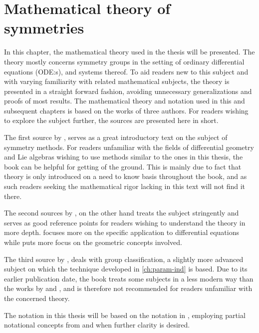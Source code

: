 \chapter{Mathematical theory of symmetries}

In this chapter, the mathematical theory used in the thesis will be presented.
The theory mostly concerns symmetry groups in the setting of ordinary differential equations (ODE:s), and systems thereof.
To aid readers new to this subject and with varying familiarity with related mathematical subjects, the theory is presented in a straight forward fashion, avoiding unnecessary generalizations and proofs of most results.
The mathematical theory and notation used in this and subsequent chapters is based on the works of three authors.
For readers wishing to explore the subject further, the sources are presented here in short.

The first source \cite{hydon2000symmetry} by \citeauthor{hydon2000symmetry}, serves as a great introductory text on the subject of symmetry methods.
For readers unfamiliar with the fields of differential geometry and Lie algebras wishing to use methods similar to the ones in this thesis, the book can be helpful for getting of the ground.
This is mainly due to fact that theory is only introduced on a need to know basis throughout the book, and as such readers seeking the mathematical rigor lacking in this text will not find it there.

The second sources \cite{olver1993applications,olver1995equivalence} by \citeauthor{olver1993applications}, on the other hand treats the subject stringently and serves as good reference points for readers wishing to understand the theory in more depth.
\cite{olver1993applications} focuses more on the specific application to differential equations while \cite{olver1995equivalence} puts more focus on the geometric concepts involved.

The third source \cite{ovsiannikov1982group} by \citeauthor{ovsiannikov1982group}, deals with group classification, a slightly more advanced subject on which the technique developed in \cref{ch:param-ind} is based.
Due to its earlier publication date, the book treats some subjects in a less modern way than the works by \citeauthor{hydon2000symmetry} and \citeauthor{olver1993applications}, and is therefore not recommended for readers unfamiliar with the concerned theory.

The notation in this thesis will be based on the notation in \cite{hydon2000symmetry}, employing partial notational concepts from \cite{olver1995equivalence} and \cite{ovsiannikov1982group} when further clarity is desired.

